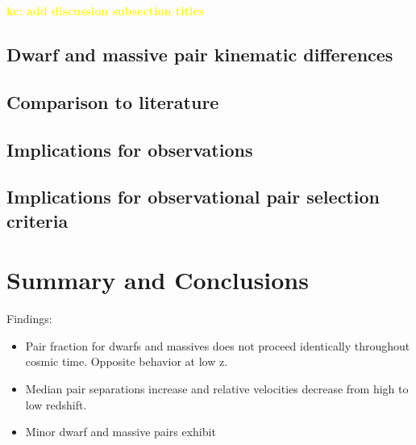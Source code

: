 \documentclass[twocolumn]{aastex631}
\newcommand{\kc}[1]{\textcolor{yellow}{\textbf{kc: #1}} }
\begin{document}
\kc{add discussion subsection titles}
\subsection{Dwarf and massive pair kinematic differences}
\subsection{Comparison to literature}
\subsection{Implications for observations}
\subsection{Implications for observational pair selection criteria}


\section{Summary and Conclusions}
\label{sec:summary}
Findings:
\begin{itemize}
    \item Pair fraction for dwarfs and massives does not proceed identically throughout cosmic time. Opposite behavior at low z. 
    \item Median pair separations increase and relative velocities decrease from high to low redshift. 
    \item Minor dwarf and massive pairs exhibit 
\end{itemize}


{}

\end{document}
